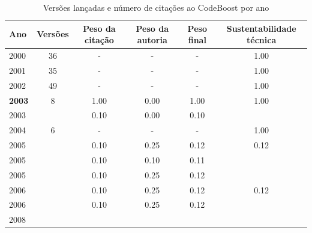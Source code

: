 \begin{table}[H]
\caption{Versões lançadas e número de citações ao CodeBoost por ano}
\centering
\begin{tabular}{| l | c | c | c | c | c |}
  \hline
  Ano & Versões & Peso da citação & Peso da autoria & Peso final & Sustentabilidade técnica \\
  \hline
        2000 & 36 & - & - & -
        &
          {\color{blue} 1.00}
        \\
\hline
        2001 & 35 & - & - & -
        &
          {\color{blue} 1.00}
        \\
\hline
        2002 & 49 & - & - & -
        &
          {\color{blue} 1.00}
        \\
\hline
            {\bf 2003}
          &
          8
          &
          1.00
          &
          0.00
          &
          1.00
          &
            {\color{blue} 1.00}
          \\
            2003
          &
          
          &
          0.10
          &
          0.00
          &
          0.10
          &
          \\
\hline
        2004 & 6 & - & - & -
        &
          {\color{blue} 1.00}
        \\
\hline
            2005
          &
          
          &
          0.10
          &
          0.25
          &
          0.12
          &
            {\color{red} 0.12}
          \\
            2005
          &
          
          &
          0.10
          &
          0.10
          &
          0.11
          &
          \\
            2005
          &
          
          &
          0.10
          &
          0.25
          &
          0.12
          &
          \\
\hline
            2006
          &
          
          &
          0.10
          &
          0.25
          &
          0.12
          &
            {\color{red} 0.12}
          \\
            2006
          &
          
          &
          0.10
          &
          0.25
          &
          0.12
          &
          \\
\hline
            2008
          &
          

\end{tabular}
\end{table}
